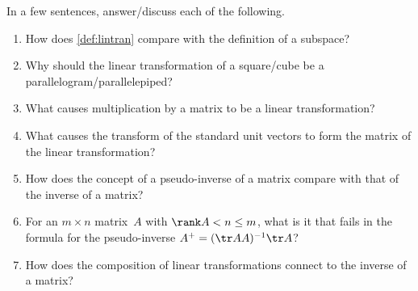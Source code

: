 \begin{exercise}  
In a few sentences, answer\slash discuss each of the following.
\begin{enumerate}
\item How does \cref{def:lintran} compare with the definition of a subspace?

\item Why should the linear transformation of a square\slash cube be a parallelogram\slash parallelepiped?

\item What causes multiplication by a matrix to be a linear transformation?

\item What causes the transform of the standard unit vectors to form the matrix of the linear transformation?

\item How does the concept of a pseudo-inverse of a matrix compare with that of the inverse of a matrix?

\item For an \(m\times n\) matrix~\(A\) with \(\rank A<n\leq m\), what is it that fails in the formula for the pseudo-inverse \(A^+=(\tr AA)^{-1}\tr A\)?

\item How does the composition of linear transformations connect to the inverse of a matrix?

\end{enumerate}
\end{exercise}

\begin{comment}%
why, what caused X?
how did X occur?
what-if? what-if-not?
how does X compare with Y?
what is the evidence for X?
why is X important?
\end{comment}

